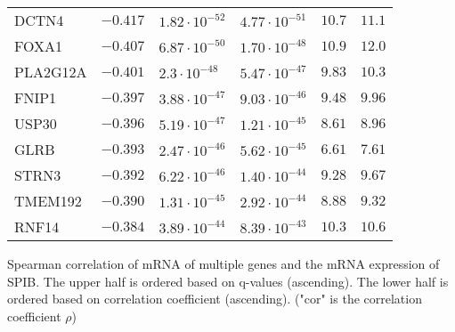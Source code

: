 \begin{table}[!p]
\begin{center}
\begin{tabular}{l|lllll}
        DCTN4	&	$-0.417$	&	$1.82\cdot 10^{-52}$	&	$4.77 \cdot 10^{-51}$	&	$10.7$	&	$11.1$\\ 
        FOXA1	&	$-0.407$	&	$6.87\cdot 10^{-50}$	&	$1.70 \cdot 10^{-48}$  &	$10.9$	&	$12.0$\\ 
        PLA2G12A	&	$-0.401$	&	$2.3\cdot 10^{-48}$	&	$5.47 \cdot 10^{-47}$	&	$9.83$	&	$10.3$\\ 
        FNIP1	&	$-0.397$	&	$3.88\cdot 10^{-47}$	&	$9.03 \cdot 10^{-46}$	&	$9.48$	&	$9.96$\\ 
        USP30	&	$-0.396$	&	$5.19\cdot 10^{-47}$	&	$1.21 \cdot 10^{-45}$	&	$8.61$	&	$8.96$\\ 
        GLRB	&	$-0.393$	&	$2.47\cdot 10^{-46}$	&	$5.62 \cdot 10^{-45}$	&	$6.61$	&	$7.61$\\ 
        STRN3	&	$-0.392$	&	$6.22\cdot 10^{-46}$	&	$1.40 \cdot 10^{-44}$  &	$9.28$	&	$9.67$\\ 
        TMEM192	&	$-0.390$	&	$1.31\cdot 10^{-45}$	&	$2.92 \cdot 10^{-44}$	&	$8.88$	&	$9.32$\\ 
        RNF14	&	$-0.384$	&	$3.89\cdot 10^{-44}$	&	$8.39 \cdot 10^{-43}$	&	$10.3$	&	$10.6$\\ 
    \end{tabular}
    \end{center}
    Spearman correlation of mRNA of multiple genes and the mRNA expression of SPIB.
    The upper half is ordered based on q-values (ascending).
    The lower half is ordered based on correlation coefficient (ascending). ("cor" is the correlation coefficient $\rho$)
    \label{mrna_table}
\end{table} 
    
